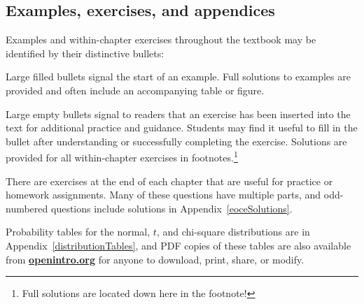 
\subsection*{Examples, exercises, and appendices}

Examples and within-chapter exercises throughout the textbook may be identified by their distinctive bullets:

\begin{example}{Large filled bullets signal the start of an example.}
Full solutions to examples are provided and often include an accompanying table or figure.
 \end{example}

\begin{exercise}
Large empty bullets signal to readers that an exercise has been inserted into the text for additional practice and guidance. Students may find it useful to fill in the bullet after understanding or successfully completing the exercise. Solutions are provided for all within-chapter exercises in footnotes.\footnote{Full solutions are located down here in the footnote!}
\end{exercise}

There are exercises at the end of each chapter that are useful for practice or homework assignments. Many of these questions have multiple parts, and odd-numbered questions include solutions in Appendix~\ref{eoceSolutions}. %

Probability tables for the normal, $t$, and chi-square distributions are in Appendix~\ref{distributionTables}, and PDF copies of these tables are also available from \href{http://www.openintro.org}{\color{black}\textbf{openintro.org}} for anyone to download, print, share, or modify.

